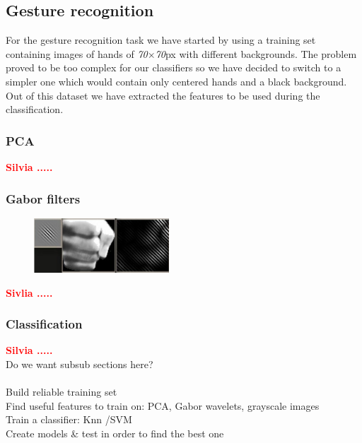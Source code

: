\documentclass[a4paper, 11pt, twocolumn]{article}
\newcommand{\todo}[1]{\textcolor{red}{\textbf{#1}}}
\begin{document}
        \subsection{Gesture recognition}
		For the gesture recognition task we have started by using a training set containing images of hands of \emph{70$\times$70}px with different backgrounds. The problem proved to be too complex for our classifiers so we have decided to switch to a simpler one which would contain only centered hands and a black background.\\ 
		\hspace*{10px}Out of this dataset we have extracted the features to be used during the classification.
		\label{sec:Meth_clssifyHands}
		\subsubsection{PCA}
		\todo{Silvia .....}\\

		\subsubsection{Gabor filters}
		\begin{flushleft}
		\begin{figure}[!hbtp]
		   \centering
		   \includegraphics[width=0.45\textwidth]{gabor.jpg}
	   	\end{figure}	
		\end{flushleft}

		\todo{Sivlia .....}\\

		\subsubsection{Classification}
		\todo{Silvia .....}\\


        Do we want subsub sections here?\\\\
        Build reliable training set\\
        Find useful features to train on: PCA, Gabor wavelets, grayscale images\\
        Train a classifier: Knn /SVM\\
        Create models \& test in order to find the best one\\
        
\end{document}
